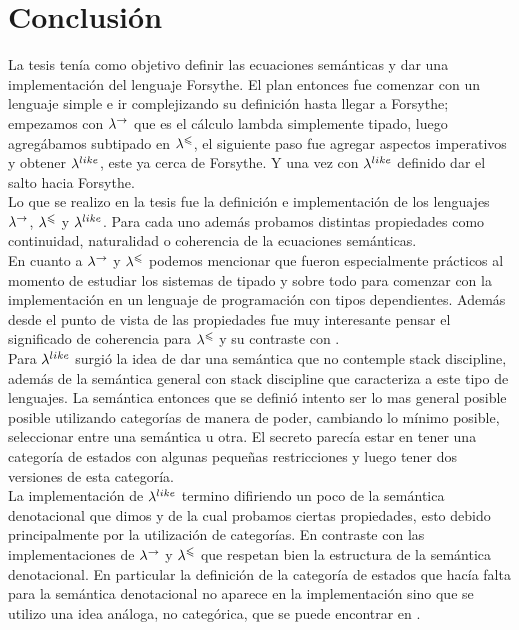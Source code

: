 \chapter{Conclusi\'on}

La tesis ten\'ia como objetivo definir las ecuaciones sem\'anticas
y dar una implementaci\'on del lenguaje Forsythe. El plan entonces fue
comenzar con un lenguaje simple e ir complejizando su definici\'on hasta
llegar a Forsythe; empezamos con $\lambda^{\rightarrow}$ que es el c\'alculo lambda
simplemente tipado, luego agreg\'abamos subtipado en $\lambda^{\leqslant}$, el siguiente
paso fue agregar aspectos imperativos y obtener $\lambda^{like}$, este ya 
cerca de Forsythe. Y una vez con $\lambda^{like}$ definido dar el salto hacia 
Forsythe.\\

Lo que se realizo en la tesis fue la definici\'on e implementaci\'on de los 
lenguajes $\lambda^{\rightarrow}$, $\lambda^{\leqslant}$ y $\lambda^{like}$. Para cada uno adem\'as 
probamos distintas propiedades como continuidad, naturalidad o coherencia 
de la ecuaciones sem\'anticas.\\

En cuanto a $\lambda^{\rightarrow}$ y $\lambda^{\leqslant}$ podemos mencionar que fueron
especialmente pr\'acticos al momento de estudiar los sistemas de tipado y
sobre todo para comenzar con la implementaci\'on en un lenguaje de programaci\'on
con tipos dependientes. Adem\'as desde el punto de vista de las propiedades
fue muy interesante pensar el significado de coherencia para $\lambda^{\leqslant}$ y
su contraste con \cite[Prop 4]{coherencereynolds}.\\

Para $\lambda^{like}$ surgi\'o la idea de dar una sem\'antica que no contemple stack
discipline, adem\'as de la sem\'antica general con stack discipline que caracteriza 
a este tipo de lenguajes. La sem\'antica entonces que se defini\'o intento ser
lo mas general posible posible utilizando categor\'ias
de manera de poder, cambiando lo m\'inimo posible, seleccionar entre una
sem\'antica u otra. El secreto parec\'ia estar en tener una categor\'ia
de estados con algunas pequeñas restricciones y luego tener dos versiones
de esta categor\'ia.\\
La implementaci\'on de $\lambda^{like}$ termino difiriendo un poco de la sem\'antica
denotacional que dimos y de la cual probamos ciertas propiedades, esto 
debido principalmente por la utilizaci\'on de categor\'ias. En contraste
con las implementaciones de $\lambda^{\rightarrow}$ y $\lambda^{\leqslant}$ que respetan 
bien la estructura de la sem\'antica denotacional. En particular la definici\'on
de la categor\'ia de estados que hac\'ia falta para la sem\'antica denotacional
no aparece en la implementaci\'on sino que se utilizo una idea an\'aloga, no
categ\'orica, que se puede encontrar en \cite[Cap 19]{reynolds2009theories}.\\

